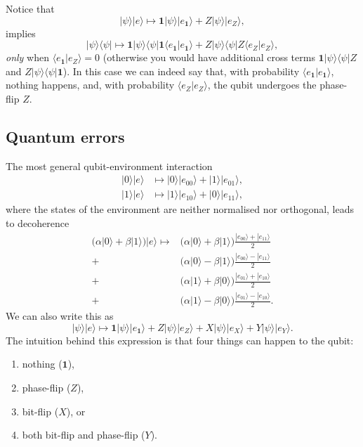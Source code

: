 \documentclass[fleqn]{article}
\providecommand{\tightlist}{%
  \setlength{\itemsep}{0pt}\setlength{\parskip}{0pt}}
\begin{document}
Notice that
\[
|\psi\rangle|e\rangle \longmapsto \mathbf{1}|\psi\rangle|e_{\mathbf{1}}\rangle+Z|\psi\rangle|e_Z\rangle,
\]
implies
\[
|\psi\rangle\langle\psi|\longmapsto \mathbf{1}|\psi\rangle\langle\psi| \mathbf{1}\langle e_{\mathbf{1}}|e_{\mathbf{1}}\rangle +Z|\psi\rangle\langle\psi| Z\langle e_Z|e_Z\rangle,
\]
\emph{only} when \(\langle e_{\mathbf{1}}|e_Z\rangle=0\) (otherwise you would have additional cross terms \(\mathbf{1}|\psi\rangle\langle\psi| Z\) and \(Z|\psi\rangle\langle\psi| \mathbf{1}\)).
In this case we can indeed say that, with probability \(\langle e_{\mathbf{1}}|e_{\mathbf{1}}\rangle\), nothing happens, and, with probability \(\langle e_Z|e_Z\rangle\), the qubit undergoes the phase-flip \(Z\).

\hypertarget{quantum-errors}{%
\subsection{Quantum errors}\label{quantum-errors}}

The most general qubit-environment interaction
\[
  \begin{aligned}
    |0\rangle|e\rangle &\longmapsto |0\rangle|e_{00}\rangle + |1\rangle|e_{01}\rangle,
  \\|1\rangle|e\rangle &\longmapsto |1\rangle|e_{10}\rangle + |0\rangle|e_{11}\rangle,
  \end{aligned}
\]
where the states of the environment are neither normalised nor orthogonal, leads to decoherence
\[
  \begin{aligned}
    \Big( \alpha|0\rangle + \beta|1\rangle \Big) |e\rangle \longmapsto
    & \Big( \alpha|0\rangle + \beta|1\rangle \Big) \frac{|e_{00}\rangle+|e_{11}\rangle}{2}
  \\+& \Big( \alpha|0\rangle - \beta|1\rangle \Big) \frac{|e_{00}\rangle-|e_{11}\rangle}{2}
  \\+& \Big( \alpha|1\rangle + \beta|0\rangle \Big) \frac{|e_{01}\rangle+|e_{10}\rangle}{2}
  \\+& \Big( \alpha|1\rangle - \beta|0\rangle \Big) \frac{|e_{01}\rangle-|e_{10}\rangle}{2}.
  \end{aligned}
\]
We can also write this as
\[
|\psi\rangle|e\rangle \longmapsto  \mathbf{1}|\psi\rangle|e_{\mathbf{1}}\rangle + Z|\psi\rangle |e_Z\rangle +X|\psi\rangle |e_X\rangle + Y|\psi\rangle |e_Y\rangle.
\]
The intuition behind this expression is that four things can happen to the qubit:

\begin{enumerate}
\def\labelenumi{\arabic{enumi}.}
\tightlist
\item
  nothing (\(\mathbf{1}\)),
\item
  phase-flip (\(Z\)),
\item
  bit-flip (\(X\)), or
\item
  both bit-flip and phase-flip (\(Y\)).
\end{enumerate}
\end{document}
